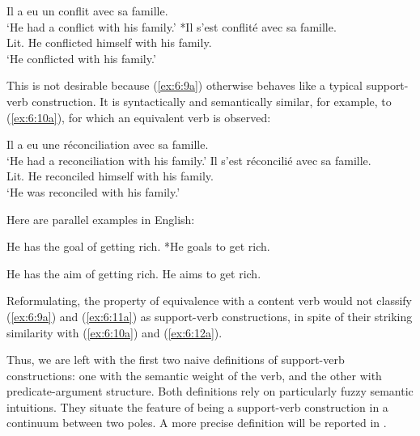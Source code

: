 \documentclass[output=paper]{langsci/langscibook}
\begin{document}
\begin{exe}
\ex \begin{xlist} 
\ex \label{ex:6:9a}
Il a eu un conflit avec sa famille.\\
 ‘He had a conflict with his family.’
\ex \label{ex:6:9b}
 *Il s’est conflité avec sa famille.\\
Lit. He conflicted himself with his family. \\
‘He conflicted with his family.’
\end{xlist}
\end{exe}

\noindent This is not desirable because (\ref{ex:6:9a}) otherwise behaves like a typical support-verb construction. It is syntactically and semantically similar, for example, to (\ref{ex:6:10a}), for which an equivalent verb is observed:


\begin{exe}
\ex \begin{xlist}
\ex \label{ex:6:10a} 
Il a eu une réconciliation avec sa famille.\\
  ‘He had a reconciliation with his family.’
\ex \label{ex:6:10b}
Il s’est réconcilié avec sa famille.\\
Lit. He reconciled himself with his family.\\
‘He was reconciled with his family.’
\end{xlist}
\end{exe}

\noindent Here are parallel examples in English: 


\begin{exe}
\ex \begin{xlist}
\ex \label{ex:6:11a} 
He has the goal of getting rich.
\ex \label{ex:6:11b}
*He goals to get rich.
\end{xlist}
\end{exe}


\begin{exe}
\ex \begin{xlist}
\ex \label{ex:6:12a} 
He has the aim of getting rich.
\ex \label{ex:6:12b}
He aims to get rich.
\end{xlist}
\end{exe}
	

\noindent Reformulating, the property of equivalence with a content verb would not classify (\ref{ex:6:9a}) and (\ref{ex:6:11a}) as support-verb constructions, in spite of their striking similarity with (\ref{ex:6:10a}) and (\ref{ex:6:12a}).

Thus, we are left with the first two naive definitions of support-verb constructions: one with the semantic weight of the verb, and the other with predicate-argument structure. Both definitions rely on particularly fuzzy semantic intuitions. They situate the feature of being a support-verb construction in a continuum between two poles. A more precise definition will be reported in .
\end{document}
